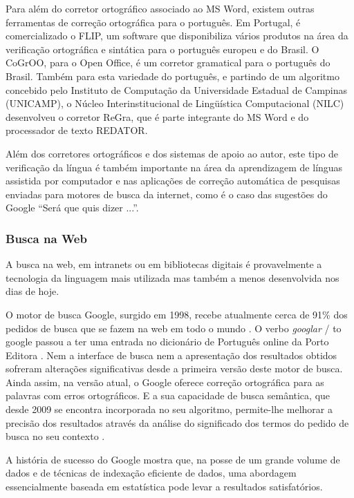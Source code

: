 \begin{multicols}{2}
Para além do corretor ortográfico associado ao MS Word, existem ou\-tras ferramentas de correção ortográfica para o português. 
Em Portugal, é comercializado o FLIP, um software que disponibiliza vários produtos na área da verificação ortográfica 
e sintática para o português europeu e do Brasil. O CoGrOO, para o Open Office, é um corretor gramatical para o português do Brasil. 
Também para esta variedade do português, e partindo de um algoritmo concebido pelo Instituto de Computação da
Universidade Estadual de Campinas (UNICAMP), o Núcleo Interinstitucional de Lingüística Computacional (NILC) 
desenvolveu o corretor ReGra, que é parte integrante do MS Word e do processador de texto REDATOR.

Além dos corretores ortográficos e dos sistemas de apoio ao autor, este tipo de verificação da língua é também importante na área da aprendizagem de línguas assistida por computador e nas aplicações de correção automática de pesquisas enviadas para motores de busca da internet, como é o caso das sugestões do Google “Será que quis dizer ...”.

\subsubsection{Busca na Web}

 A busca na web, em intranets ou em bibliotecas digitais é provavelmente a tecnologia da linguagem mais utilizada mas também a menos desenvolvida nos dias de hoje.

O motor de busca Google, surgido em 1998, recebe atualmente cerca de 91\% dos pedidos de busca que se fazem na web em todo o mundo \cite{spi1}. 
O verbo \textit{googlar} / to google passou a ter uma entrada no dicionário de Português online da Porto Editora \cite{portoeditoraonline}. 
Nem a interface de busca nem a apresentação dos resultados obtidos sofreram alterações significativas desde a primeira versão deste motor de busca. 
Ainda assim, na versão atual, o Google o\-fe\-re\-ce correção ortográfica para as palavras com erros ortográficos. 
E a sua capacidade de busca semântica, que desde 2009 se encontra incorporada no seu algoritmo, 
permite-lhe melhorar a precisão dos resultados através da análise do significado dos termos do pedido de busca no seu contexto \cite{pc1}. 

A história de sucesso do Google mostra que, na posse de um grande volume de dados e de técnicas de indexação eficiente de dados, 
uma abordagem essencialmente baseada em estatística pode levar a resultados satisfatórios.


\end{multicols}
